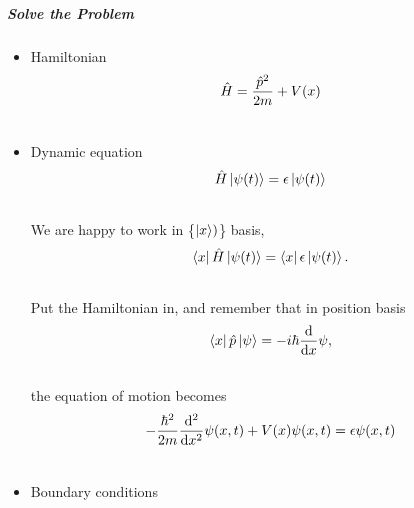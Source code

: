 \documentclass[letterpaper,10pt,english]{sphinxmanual}
\def\d{{\rm d}}
\begin{document}
\subparagraph{Solve the Problem}
\label{QuantumMechanics:solve-the-problem}\begin{itemize}
\item {} 
Hamiltonian
\begin{gather}
\begin{split}\hat H = \frac{\hat p ^2}{2 m } + V(x)\end{split}\notag\\\begin{split}\end{split}\notag
\end{gather}
\item {} 
Dynamic equation
\begin{gather}
\begin{split}\hat H \ket{\psi(t)} = \epsilon \ket{\psi(t)}\end{split}\notag\\\begin{split}\end{split}\notag
\end{gather}
We are happy to work in \{$\ket{x})$\} basis,
\begin{gather}
\begin{split}\bra{x} \hat H \ket{\psi(t)} = \bra{x} \epsilon \ket{\psi(t)} .\end{split}\notag\\\begin{split}\end{split}\notag
\end{gather}
Put the Hamiltonian in, and remember that in position basis
\begin{gather}
\begin{split}\bra{x} \hat p \ket{\psi} = - i \hbar\frac{\d}{\d x} \psi ,\end{split}\notag\\\begin{split}\end{split}\notag
\end{gather}
the equation of motion becomes
\begin{gather}
\begin{split}- \frac{\hbar ^2}{2 m} \frac{\d^2}{\d x^2} \psi(x,t) + V(x) \psi(x,t) = \epsilon \psi(x,t)\end{split}\notag\\\begin{split}\end{split}\notag
\end{gather}
\item {} 
Boundary conditions

\end{itemize}
\end{document}
